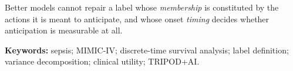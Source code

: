Better models cannot repair a label whose \emph{membership} is constituted by
the actions it is meant to anticipate, and whose onset \emph{timing} decides
whether anticipation is measurable at all.

\vspace{0.4em}
\noindent\textbf{Keywords:} sepsis; MIMIC-IV; discrete-time survival analysis;
label definition; variance decomposition; clinical utility; TRIPOD+AI.

